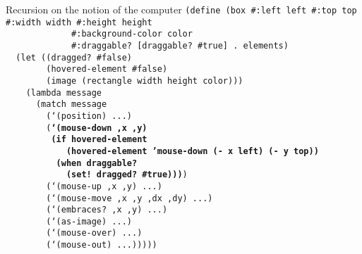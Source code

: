 \begin{frame}{Recursion on the notion of the computer}
  \tiny
  \texttt{(define (box \#:left left \#:top top \#:width width \#:height height\\
    \ \ \ \ \ \ \ \ \ \ \ \ \ \#:background-color color\\
    \ \ \ \ \ \ \ \ \ \ \ \ \ \#:draggable? [draggable? \#true] . elements)\\
    \ \ (let ((dragged? \#false)\\
    \ \ \ \ \ \ \ \ (hovered-element \#false)\\
    \ \ \ \ \ \ \ \ (image (rectangle width height color)))\\
    \ \ \ \ (lambda message\\
    \ \ \ \ \ \ (match message\\
    \ \ \ \ \ \ \ \ (`(position) ...)\\
    \ \ \ \ \ \ \ \ (\textbf{`(mouse-down ,x ,y)\\
      \ \ \ \ \ \ \ \ \ (if hovered-element\\
      \ \ \ \ \ \ \ \ \ \ \ \ (hovered-element 'mouse-down (- x left) (- y top))\\
      \ \ \ \ \ \ \ \ \ \ (when draggable?\\
      \ \ \ \ \ \ \ \ \ \ \ \ (set!\ dragged? \#true)))})\\
    \ \ \ \ \ \ \ \ (`(mouse-up ,x ,y) ...)\\
    \ \ \ \ \ \ \ \ (`(mouse-move ,x ,y ,dx ,dy) ...)\\
    \ \ \ \ \ \ \ \ (`(embraces? ,x ,y) ...)\\
    \ \ \ \ \ \ \ \ (`(as-image) ...)\\
    \ \ \ \ \ \ \ \ (`(mouse-over) ...)\\
    \ \ \ \ \ \ \ \ (`(mouse-out) ...)))))\\
    \ \\
    \ \\
    \ \\
    \ \\
    \ \\
    \ \\
    \ \\
    \ 
    }
\end{frame}

